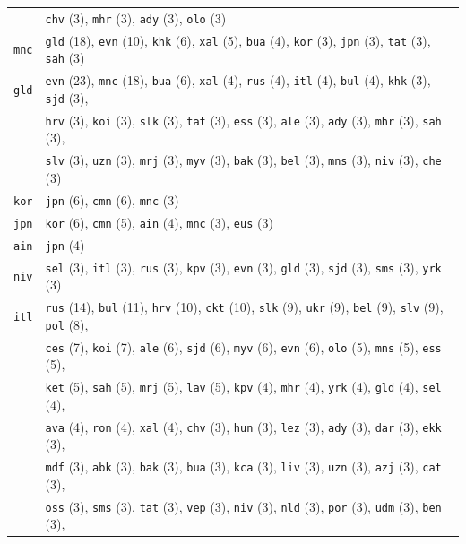 \begin{center}
\begin{longtable}{ll}
 & \texttt{chv} (3), \texttt{mhr} (3), \texttt{ady} (3), \texttt{olo} (3) \\
\texttt{mnc} & \texttt{gld} (18), \texttt{evn} (10), \texttt{khk} (6), \texttt{xal} (5), \texttt{bua} (4), \texttt{kor} (3), \texttt{jpn} (3), \texttt{tat} (3), \texttt{sah} (3) \\
\texttt{gld} & \texttt{evn} (23), \texttt{mnc} (18), \texttt{bua} (6), \texttt{xal} (4), \texttt{rus} (4), \texttt{itl} (4), \texttt{bul} (4), \texttt{khk} (3), \texttt{sjd} (3), \\
 & \texttt{hrv} (3), \texttt{koi} (3), \texttt{slk} (3), \texttt{tat} (3), \texttt{ess} (3), \texttt{ale} (3), \texttt{ady} (3), \texttt{mhr} (3), \texttt{sah} (3), \\
 & \texttt{slv} (3), \texttt{uzn} (3), \texttt{mrj} (3), \texttt{myv} (3), \texttt{bak} (3), \texttt{bel} (3), \texttt{mns} (3), \texttt{niv} (3), \texttt{che} (3) \\
\texttt{kor} & \texttt{jpn} (6), \texttt{cmn} (6), \texttt{mnc} (3) \\
\texttt{jpn} & \texttt{kor} (6), \texttt{cmn} (5), \texttt{ain} (4), \texttt{mnc} (3), \texttt{eus} (3) \\
\texttt{ain} & \texttt{jpn} (4) \\
\texttt{niv} & \texttt{sel} (3), \texttt{itl} (3), \texttt{rus} (3), \texttt{kpv} (3), \texttt{evn} (3), \texttt{gld} (3), \texttt{sjd} (3), \texttt{sms} (3), \texttt{yrk} (3) \\
\texttt{itl} & \texttt{rus} (14), \texttt{bul} (11), \texttt{hrv} (10), \texttt{ckt} (10), \texttt{slk} (9), \texttt{ukr} (9), \texttt{bel} (9), \texttt{slv} (9), \texttt{pol} (8), \\
 & \texttt{ces} (7), \texttt{koi} (7), \texttt{ale} (6), \texttt{sjd} (6), \texttt{myv} (6), \texttt{evn} (6), \texttt{olo} (5), \texttt{mns} (5), \texttt{ess} (5), \\
 & \texttt{ket} (5), \texttt{sah} (5), \texttt{mrj} (5), \texttt{lav} (5), \texttt{kpv} (4), \texttt{mhr} (4), \texttt{yrk} (4), \texttt{gld} (4), \texttt{sel} (4), \\
 & \texttt{ava} (4), \texttt{ron} (4), \texttt{xal} (4), \texttt{chv} (3), \texttt{hun} (3), \texttt{lez} (3), \texttt{ady} (3), \texttt{dar} (3), \texttt{ekk} (3), \\
 & \texttt{mdf} (3), \texttt{abk} (3), \texttt{bak} (3), \texttt{bua} (3), \texttt{kca} (3), \texttt{liv} (3), \texttt{uzn} (3), \texttt{azj} (3), \texttt{cat} (3), \\
 & \texttt{oss} (3), \texttt{sms} (3), \texttt{tat} (3), \texttt{vep} (3), \texttt{niv} (3), \texttt{nld} (3), \texttt{por} (3), \texttt{udm} (3), \texttt{ben} (3), \\

\end{longtable}
\end{center}

